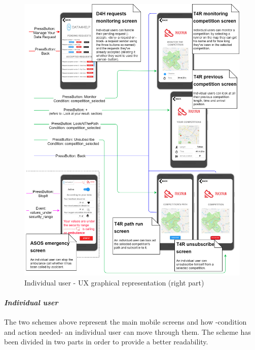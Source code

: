 \begin{figure}[H]
\caption{Individual user - UX graphical representation (right part)}
\includegraphics[width = \textwidth]{sections/userInterfacesGraphs/UserExperienceScreenDX.png}
\end{figure}
\paragraph{\textit{Individual user}}The two schemes above represent the main mobile screens and how -condition and action needed- an individual user can move through them.
The scheme has been divided in two parts in order to provide a better readability. 
 
 